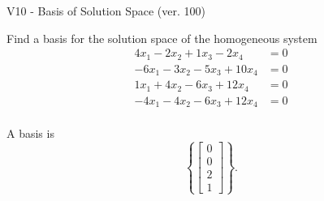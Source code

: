 \begin{exercise}
  \begin{exerciseTitle}V10 - Basis of Solution Space (ver. 100)\end{exerciseTitle}
  \begin{exerciseStatement}
    Find a basis for the solution space of the homogeneous system 
\begin{align*}
 4 x_ 1 -2 x_ 2 + 1 x_ 3 -2 x_ 4 &= 0  \\ 
  -6 x_ 1 -3 x_ 2 -5 x_ 3 + 10 x_ 4 &= 0  \\ 
  1 x_ 1 + 4 x_ 2 -6 x_ 3 + 12 x_ 4 &= 0  \\ 
  -4 x_ 1 -4 x_ 2 -6 x_ 3 + 12 x_ 4 &= 0  \\ 
 \end{align*}


 
  \end{exerciseStatement}

  \begin{exerciseAnswer}
   A basis is   
\[\left\{\left[\begin{array}{c}
0 \\
0 \\
2 \\
1
\end{array}\right]\right\}.\]

  


  \end{exerciseAnswer}
\end{exercise}